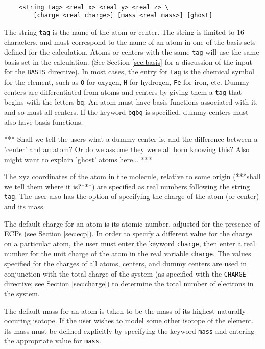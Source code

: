 \begin{verbatim}

    <string tag> <real x> <real y> <real z> \
        [charge <real charge>] [mass <real mass>] [ghost]

\end{verbatim}

The string \verb+tag+ is the name of the atom or center.  The string is limited to
16 characters, and must correspond to the
name of an atom in one of the basis sets defined for the calculation.
Atoms or centers with the same \verb+tag+ will use the same basis set in
the calculation. 
(See Section \ref{sec:basis} for a discussion of the input for the
\verb+BASIS+ directive).  In most cases, the entry for \verb+tag+ is the
chemical symbol for the element, such as \verb+O+ for oxygen, \verb+H+
for hydrogen, \verb+Fe+ for iron, etc.  Dummy centers 
are differentiated from atoms and centers by giving them a \verb+tag+ that 
begins with the letters \verb+bq+.  An atom must have basis functions
associated with it, and so must all centers.  If the keyword \verb+bqbq+
is specified, dummy centers must also have basis functions.

\Large
***
Shall we tell the users what a dummy center is, and the difference
between a 'center' and an atom?  Or do we assume they were all born
knowing this?  Also might want to explain 'ghost' atoms here...
***
\normalsize

The xyz coordinates of the atom in the molecule, relative to some origin
(***shall we tell them where it is?***) are specified as real numbers 
following the string \verb+tag+.  The user also has the option of 
specifying the charge of the atom (or center) and its mass.  

The default charge for an
atom is its atomic number, adjusted for the presence of ECPs (see Section
\ref{sec:ecp}).  In order to specify a different value for the
charge on a particular atom, the user must enter
the keyword \verb+charge+, then enter a real number for the unit charge
of the atom in the real variable \verb+charge+.  The values specified for the charges of 
all atoms, centers, and
dummy centers are used in conjunction with the 
total charge of the system (as specified with the \verb+CHARGE+ directive; 
see Section 
\ref{sec:charge}) to determine the total number of electrons in the system.

The default mass for an atom is taken to be the mass of its highest naturally
occuring isotope.  If the user wishes to model some other isotope of the
element, its mass must be defined explicitly by specifying the keyword 
\verb+mass+ and entering the appropriate value for \verb+mass+.  

